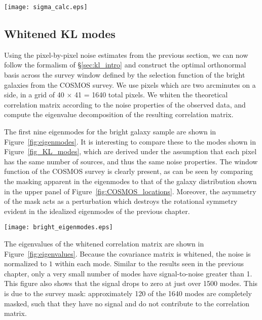 \begin{figure*}
 \centering
 \texttt{[image: sigma\_calc.eps]}
 \caption{Bootstrap estimates of the shape noise for each pixel.  The estimates
   reflect an intrinsic ellipticity of $0.393 \pm 0.013$.
   \label{fig:bootstrap}}
\end{figure*}

\subsection{Whitened KL modes}
Using the pixel-by-pixel noise estimates from the previous section, we can
now follow the formalism of \S\ref{sec:kl_intro} and construct the optimal
orthonormal basis across the survey window defined by the selection function
of the bright galaxies from the COSMOS survey.  We use pixels which are
two arcminutes on a side, in a grid of 40 $\times$ 41 = 1640 total
pixels.  We whiten the theoretical correlation matrix according to the noise
properties of the observed data, and compute the eigenvalue decomposition
of the resulting correlation matrix.

The first nine eigenmodes for the bright galaxy sample
are shown in Figure~\ref{fig:eigenmodes}.
It is interesting to compare these to the modes shown in
Figure~\ref{fig_KL_modes}, which are derived under the assumption that
each pixel has the same number of sources, and thus the same noise properties.
The window function of the COSMOS survey is clearly present, as can be
seen by comparing the
masking apparent in the eigenmodes to that of the galaxy distribution
shown in the upper panel of Figure~\ref{fig:COSMOS_locations}.
Moreover, the asymmetry of the mask acts as a perturbation which destroys
the rotational symmetry evident in the idealized eigenmodes of
the previous chapter.

\begin{figure*}
 \centering
 \texttt{[image: bright\_eigenmodes.eps]}
 \caption{
   The first nine 2D KL signal-to-noise eigenmodes
   for the COSMOS bright objects.  This uses square pixels which are
   two arcminutes on a side, leading to $41 \times 40 = 1640$ pixels
   over the entire field.}
   \label{fig:eigenmodes}
\end{figure*}

The eigenvalues of the whitened correlation matrix are shown in
Figure~\ref{fig:eigenvalues}.  Because the covariance matrix is
whitened, the noise is normalized to $1$ within each mode.
Similar to the results seen in the previous chapter, only a very small
number of modes have signal-to-noise greater than 1.
This figure also shows that the signal drops to zero at just over 1500
modes.  This is due to the survey mask: approximately 120 of the 1640
modes are completely masked, such that they have no signal and do not
contribute to the correlation matrix.

